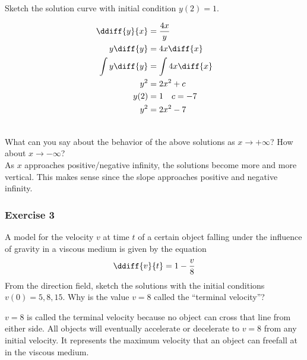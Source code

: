 \documentclass{math}
\begin{document}
Sketch the solution curve with initial condition \( y(2) = 1 \). \\[1cm]
\begin{minipage}[c]{8cm}
  \begin{align*}
    \ddiff{y}{x} &= \frac{4x}{y} \\
    y\diff{y} &= 4x\diff{x} \\
    \int y\diff{y} &= \int 4x\diff{x} \\
    y^2 &= 2x^2+c \\
    y(2) &= 1 \quad c = -7 \\
    y^2 &= 2x^2-7
  \end{align*}
\end{minipage}
\begin{minipage}[c]{8cm}
\end{minipage} \\[0.5cm]
What can you say about the behavior of the above solutions as \( x\to+\infty \)?
How about \( x\to-\infty \)? \\
As \( x \) approaches positive/negative infinity, the solutions become more and
more vertical. This makes sense since the slope approaches positive and
negative infinity.

\subsubsection*{Exercise 3}
A model for the velocity \( v \) at time \( t \) of a certain object falling
under the influence of gravity in a viscous medium is given by the equation
\[ \ddiff{v}{t} = 1-\frac{v}{8} \]
From the direction field, sketch the solutions with the initial conditions
\( v(0) = 5, 8, 15 \). Why is the value \( v = 8 \) called the ``terminal
velocity''?
\begin{center}
\end{center}
\( v = 8 \) is called the terminal velocity because no object can cross that
line from either side. All objects will eventually accelerate or decelerate
to \( v = 8 \) from any initial velocity. It represents the maximum velocity
that an object can freefall at in the viscous medium.
\end{document}
